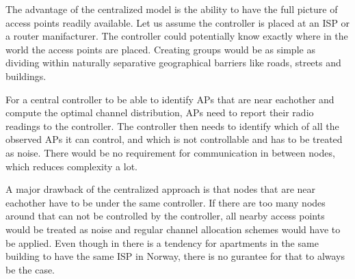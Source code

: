 The advantage of the centralized model is the ability to have the full picture of access points readily available. Let us assume the controller is placed at an ISP or a router manifacturer.
The controller could potentially know exactly where in the world the access points are placed. Creating groups would be as simple as dividing within naturally separative geographical barriers like roads, streets and buildings. 

For a central controller to be able to identify APs that are near eachother and compute the optimal channel distribution, APs need to report their radio readings to the controller. 
The controller then needs to identify which of all the observed APs it can control, and which is not controllable and has to be treated as noise. There would be no requirement for
communication in between nodes, which reduces complexity a lot.  

A major drawback of the centralized approach is that nodes that are near eachother have to be under the same controller. If there are too many nodes around
that can not be controlled by the controller, all nearby access points would be treated as noise and regular channel allocation schemes would have to be applied.
Even though in there is a tendency for apartments in the same building to have the same ISP in Norway, there is no gurantee for that to always be the case.  


